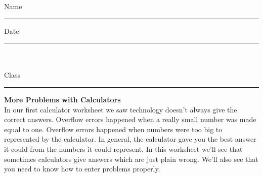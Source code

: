 \documentclass[12pt]{article}%
\begin{document}
\noindent Name \rule{80 mm}{.2pt} \hspace{35 mm} Date \rule{25 mm}{.2pt}\\\\
Class \rule{30 mm}{.2pt} \hspace{10 mm}\textbf{More Problems with Calculators}\\

In our first calculator worksheet we saw technology doesn't always give the correct answers.
Overflow errors happened when a really small number was made equal to one. Overflow errors
happened when numbers were too big to represented by the calculator. In general, the 
calculator gave you the best answer it could from the numbers it could represent. In this 
worksheet we'll see that sometimes calculators give answers which are just plain wrong. We'll
also see that you need to know how to enter problems properly.
\end{document}
